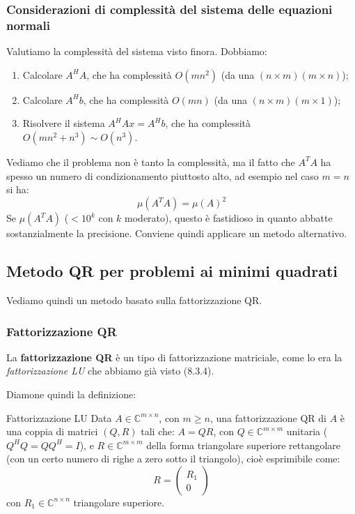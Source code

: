 \documentclass[a4paper,11pt]{article}
\begin{document}
\subsubsection{Considerazioni di complessità del sistema delle equazioni normali}
Valutiamo la complessità del sistema visto finora.
Dobbiamo:
\begin{enumerate}
	\item Calcolare $A^H A$, che ha complessità $O(mn^2)$ (da una $(n \times m) (m \times n)$);
	\item Calcolare $A^H b$, che ha complessità $O(mn)$ (da una $(n \times m)(m \times 1)$);
	\item Risolvere il sistema $A^H A x = A^H b$, che ha complessità $O(mn^2 + n^3) \sim O(n^3)$.
\end{enumerate}
Vediamo che il problema non è tanto la complessità, ma il fatto che $A^T A$ ha spesso un numero di condizionamento piuttosto alto, ad esempio nel caso $m = n$ si ha:
$$
\mu(A^T A) = \mu(A)^2
$$
Se $\mu(A^T A)$ ($< 10^k$ con $k$ moderato), questo è fastidioso in quanto abbatte sostanzialmente la precisione.
Conviene quindi applicare un metodo alternativo.

\subsection{Metodo QR per problemi ai minimi quadrati}
Vediamo quindi un metodo basato sulla fattorizzazione QR.

\subsubsection{Fattorizzazione QR}
La \textbf{fattorizzazione QR} è un tipo di fattorizzazione matriciale, come lo era la \textit{fattorizzazione LU} che abbiamo già visto (8.3.4).

Diamone quindi la definizione:
\begin{definition}{Fattorizzazione LU}
	Data $A \in \mathbb{C}^{m \times n}$, con $m \geq n$, una fattorizzazione QR di $A$ è una coppia di matrici $(Q, R)$ tali che: $A = Q R$, con $Q \in \mathbb{C}^{m \times m}$ unitaria ($Q^H Q = Q Q^H = I$), e $R \in \mathbb{C}^{m \times m}$ della forma triangolare superiore rettangolare (con un certo numero di righe a zero sotto il triangolo), cioè esprimibile come:
	$$
R = \begin{pmatrix}
R_1 \\ 0
\end{pmatrix}
	$$
	con $R_1 \in \mathbb{C}^{n \times n}$ triangolare superiore.
\end{definition}
\end{document}
